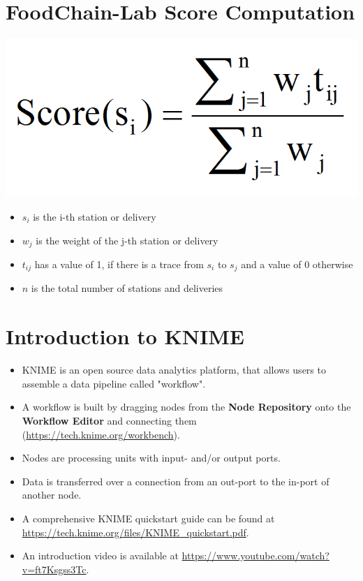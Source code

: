 \documentclass{beamer}
\begin{document}
\section{FoodChain-Lab Score Computation}
\begin{frame}
	\begin{center}
  		\includegraphics[height=0.3\textheight]{score.png}
	\end{center}
	\begin{itemize}
		\item $s_i$ is the i-th station or delivery
		\item $w_j$ is the weight of the j-th station or delivery
		\item $t_{ij}$ has a value of 1, if there is a trace from $s_i$ to $s_j$ and a value of 0 otherwise
		\item $n$ is the total number of stations and deliveries
	\end{itemize}
\end{frame}

\section{Introduction to KNIME}
\begin{frame}
	\begin{itemize}
		\item KNIME is an open source data analytics platform, that allows users to assemble a data pipeline called "workflow".
		\item A workflow is built by dragging nodes from the \textbf{Node Repository} onto the \textbf{Workflow Editor} and connecting them (\url{https://tech.knime.org/workbench}).
		\item Nodes are processing units with input- and/or output ports.
		\item Data is transferred over a connection from an out-port to the in-port of another node.
		\item A comprehensive KNIME quickstart guide can be found at \url{https://tech.knime.org/files/KNIME_quickstart.pdf}.
		\item An introduction video is available at \url{https://www.youtube.com/watch?v=ft7Ksgss3Tc}.
	\end{itemize}
\end{frame}
\end{document}
